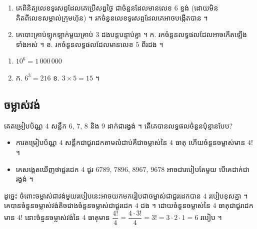 \begin{pro}
\begin{enumerate}[1]
  \item គេពិនិត្យលេខទូរសព្ទដែលគេប្រើសព្វថ្ងៃ ជាចំនួនដែលមានលេខ $6$ ខ្ទង់ (ដោយមិនគិតពីលេខសម្គាល់ក្រុមហ៊ុន) ។ រកចំនួនលេខទូរសព្ទដែលគេអាចបង្កើតបាន ។
  \item គេបោះគ្រាប់ឡុកឡាក់មួយគ្រាប់ $3$ ដងបន្តបន្ទាប់គ្នា ។ ក. រកចំនួនលទ្ធផលដែលអាចកើតឡើងទាំងអស់ ។ \quad ខ. រកចំនួនលទ្ធផលដែលមានលេខ $5$ ពីរដង ។
\end{enumerate}
\ans
\begin{enumerate}[1]
  \item $10^6 = 1\,000\,000$
  \item ក. $6^3 = 216$ \quad ខ. $3\times 5 = 15$ ។
\end{enumerate}
\end{pro}

\subsection{ចម្លាស់វង់}

\begin{example}[ឧទាហរណ៍]
គេតម្រៀបប័ណ្ណ $4$ សន្លឹក $6$, $7$, $8$ និង $9$ ដាក់ជារង្វង់ ។ តើគេបានលទ្ធផលចំនួនប៉ុន្មានបែប?
\end{example}
\begin{itemize}
  \item ការតម្រៀបប័ណ្ណ $4$ សន្លឹកជាជួរដេកតាមលំដាប់គឺជាចម្លាស់នៃ $4$ ធាតុ ហើយចំនួនចម្លាស់មាន $4!$ ។
  \item គេសង្កេតឃើញថាជួរដេក $4$ ជួរ $6789$, $7896$, $8967$, $9678$ អាចជារបៀបតែមួយ បើគេដាក់ជារង្វង់ ។
\end{itemize}

\begin{center}
\end{center}

ដូច្នេះ ចំពោះចម្លាស់ជាវង់មួយរបៀបនេះអាចយកមករៀបជាចម្លាស់ជាជួរដេកបាន $4$ របៀបខុសគ្នា ។ គេបានចំនួនចម្លាស់វង់តិចជាងចំនួនចម្លាស់ជាជួរដេក $4$ ដង ។ ដោយចំនួនចម្លាស់នៃ $4$ ធាតុជាជួរដេកមាន $4!$ នោះចំនួនចម្លាស់វង់នៃ $4$ ធាតុមាន $\dfrac{4!}{4} = \dfrac{4\cdot 3!}{4} = 3! = 3\cdot 2\cdot 1 = 6$ របៀប ។

